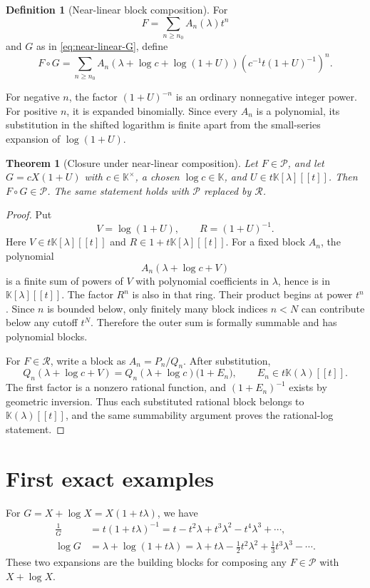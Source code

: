 \documentclass[11pt,openany]{book}
\theoremstyle{definition}
\newtheorem{definition}{Definition}[chapter]
\theoremstyle{plain}
\newtheorem{theorem}{Theorem}[chapter]
\theoremstyle{remark}
\newcommand{\K}{\mathbb{K}}
\newcommand{\Plog}{\mathscr{P}}
\newcommand{\Rlog}{\mathscr{R}}
\begin{document}
\begin{definition}[Near-linear block composition]\label{def:near-linear-composition}
For
\[
 F=\sum_{n\ge n_0}A_n(\lambda)t^n
\]
and \(G\) as in \cref{eq:near-linear-G}, define
\begin{equation}\label{eq:exact-block-composition}
 F\circ G
 =\sum_{n\ge n_0}
 A_n\!\left(\lambda+\log c+\log(1+U)\right)
 \left(c^{-1}t(1+U)^{-1}\right)^n.
\end{equation}
\end{definition}
For negative \(n\), the factor \((1+U)^{-n}\) is an ordinary nonnegative integer power. For positive \(n\), it is expanded binomially. Since every \(A_n\) is a polynomial, its substitution in the shifted logarithm is finite apart from the small-series expansion of \(\log(1+U)\).

\begin{theorem}[Closure under near-linear composition]\label{thm:near-linear-closure}
Let \(F\in\Plog\), and let \(G=cX(1+U)\) with \(c\in\K^\times\), a chosen \(\log c\in\K\), and \(U\in t\K[\lambda][[t]]\). Then \(F\circ G\in\Plog\). The same statement holds with \(\Plog\) replaced by \(\Rlog\).
\end{theorem}

\begin{proof}
Put
\[
 V=\log(1+U),\qquad R=(1+U)^{-1}.
\]
Here \(V\in t\K[\lambda][[t]]\) and \(R\in1+t\K[\lambda][[t]]\). For a fixed block \(A_n\), the polynomial
\[
 A_n(\lambda+\log c+V)
\]
is a finite sum of powers of \(V\) with polynomial coefficients in \(\lambda\), hence is in \(\K[\lambda][[t]]\). The factor \(R^n\) is also in that ring. Their product begins at power \(t^n\). Since \(n\) is bounded below, only finitely many block indices \(n<N\) can contribute below any cutoff \(t^N\). Therefore the outer sum is formally summable and has polynomial blocks.

For \(F\in\Rlog\), write a block as \(A_n=P_n/Q_n\). After substitution,
\[
 Q_n(\lambda+\log c+V)
 =Q_n(\lambda+\log c)\bigl(1+E_n\bigr),
 \qquad E_n\in t\K(\lambda)[[t]].
\]
The first factor is a nonzero rational function, and \((1+E_n)^{-1}\) exists by geometric inversion. Thus each substituted rational block belongs to \(\K(\lambda)[[t]]\), and the same summability argument proves the rational-log statement.
\end{proof}

\section{First exact examples}
For \(G=X+\log X=X(1+t\lambda)\), we have
\begin{align}
 \frac1G&=t(1+t\lambda)^{-1}
 =t-t^2\lambda+t^3\lambda^2-t^4\lambda^3+\cdots,
 \label{eq:inverse-XlogX}\\
 \log G&=\lambda+\log(1+t\lambda)
 =\lambda+t\lambda-\frac12t^2\lambda^2
 +\frac13t^3\lambda^3-\cdots.
 \label{eq:log-XlogX}
\end{align}
These two expansions are the building blocks for composing any \(F\in\Plog\) with \(X+\log X\).
\end{document}
